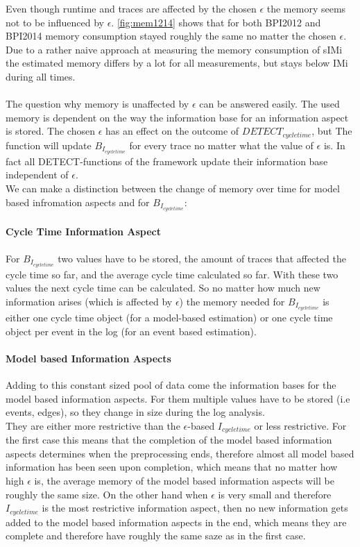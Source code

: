 \documentclass[
	a4paper,
	pagesize,
	pdftex,
	12pt,
	twoside, %
	BCOR=5mm, %
	ngerman,
	fleqn,
	final,
	]{scrartcl}
\begin{document}
Even though runtime and traces are affected by the chosen $\epsilon$ the memory seems not to be influenced by $\epsilon$. \ref{fig:mem1214} shows that for both BPI2012 and BPI2014 memory consumption stayed roughly the same no matter the chosen $\epsilon$. Due to a rather naive approach at measuring the memory consumption of sIMi the estimated memory differs by a lot for all measurements, but stays below IMi during all times.\\\\
The question why memory is unaffected by $\epsilon$ can be answered easily. The used memory is dependent on the way the information base for an information aspect is stored. The chosen $\epsilon$ has an effect on the outcome of $DETECT_{cycle time}$, but The function will update $B_{I_{cycle time}}$ for every trace no matter what the value of $\epsilon$ is. In fact all DETECT-functions of the framework update their information base independent of $\epsilon.$\\
We can make a distinction between the change of memory over time for model based infromation aspects and for $B_{I_{cycle time}}$:\\
\paragraph{Cycle Time Information Aspect}
For $B_{I_{cycle time}}$ two values have to be stored, the amount of traces that affected the cycle time so far, and the average cycle time calculated so far. With these two values the next cycle time can be calculated. So no matter how much new information arises (which is affected by $\epsilon$) the memory needed for $B_{I_{cycle time}}$ is either one cycle time object (for a model-based estimation) or one cycle time object per event in the log (for an event based estimation).\\ 
\paragraph{Model based Information Aspects}
Adding to this constant sized pool of data come the information bases for the model based information aspects.
For them multiple values have to be stored (i.e events, edges), so they change in size during the log analysis.\\
They are either more restrictive than the $\epsilon$-based $I_{cycle time}$ or less restrictive. For the first case this means that the completion of the model based information aspects determines when the preprocessing ends, therefore almost all model based information has been seen upon completion, which means that no matter how high $\epsilon$ is, the average memory of the model based information aspects will be roughly the same size. On the other hand when $\epsilon$ is very small and therefore $I_{cycle time}$ is the most restrictive information aspect, then no new information gets added to the model based information aspects in the end, which means they are complete and therefore have roughly the same saze as in the first case.\\
\end{document}
